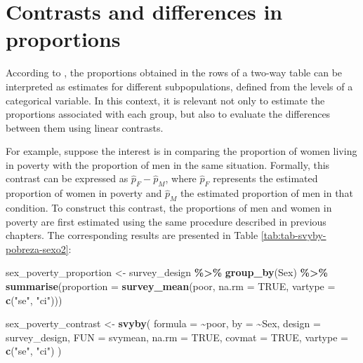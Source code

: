 \documentclass[
  english,
  12pt,
]{book}
\newenvironment{Shaded}{\begin{snugshade}}{\end{snugshade}}
\newcommand{\AttributeTok}[1]{\textcolor[rgb]{0.13,0.29,0.53}{#1}}
\newcommand{\ConstantTok}[1]{\textcolor[rgb]{0.56,0.35,0.01}{#1}}
\newcommand{\FunctionTok}[1]{\textcolor[rgb]{0.13,0.29,0.53}{\textbf{#1}}}
\newcommand{\NormalTok}[1]{#1}
\newcommand{\OtherTok}[1]{\textcolor[rgb]{0.56,0.35,0.01}{#1}}
\newcommand{\SpecialCharTok}[1]{\textcolor[rgb]{0.81,0.36,0.00}{\textbf{#1}}}
\newcommand{\StringTok}[1]{\textcolor[rgb]{0.31,0.60,0.02}{#1}}
\begin{document}
\section{Contrasts and differences in proportions}\label{contrastes-y-diferencias-de-proporciones}

According to \citet{heeringa2017applied}, the proportions obtained in the rows of a two-way table can be interpreted as estimates for different subpopulations, defined from the levels of a categorical variable. In this context, it is relevant not only to estimate the proportions associated with each group, but also to evaluate the differences between them using linear contrasts.

For example, suppose the interest is in comparing the proportion of women living in poverty with the proportion of men in the same situation. Formally, this contrast can be expressed as \(\hat{p}_F - \hat{p}_M\), where \(\hat{p}_F\) represents the estimated proportion of women in poverty and \(\hat{p}_M\) the estimated proportion of men in that condition. To construct this contrast, the proportions of men and women in poverty are first estimated using the same procedure described in previous chapters. The corresponding results are presented in Table \ref{tab:tab-svyby-pobreza-sexo2}:

\begin{Shaded}
\begin{Highlighting}[]
\NormalTok{sex\_poverty\_proportion }\OtherTok{\textless{}{-}}\NormalTok{ survey\_design }\SpecialCharTok{\%\textgreater{}\%}
  \FunctionTok{group\_by}\NormalTok{(Sex) }\SpecialCharTok{\%\textgreater{}\%}
  \FunctionTok{summarise}\NormalTok{(}\AttributeTok{proportion =} \FunctionTok{survey\_mean}\NormalTok{(poor,}
                                     \AttributeTok{na.rm =} \ConstantTok{TRUE}\NormalTok{,}
                                     \AttributeTok{vartype =} \FunctionTok{c}\NormalTok{(}\StringTok{"se"}\NormalTok{, }\StringTok{"ci"}\NormalTok{)))}

\NormalTok{sex\_poverty\_contrast }\OtherTok{\textless{}{-}} \FunctionTok{svyby}\NormalTok{(}
  \AttributeTok{formula =} \SpecialCharTok{\textasciitilde{}}\NormalTok{poor,}
  \AttributeTok{by =} \SpecialCharTok{\textasciitilde{}}\NormalTok{Sex,}
  \AttributeTok{design =}\NormalTok{ survey\_design,}
  \AttributeTok{FUN =}\NormalTok{ svymean,}
  \AttributeTok{na.rm =} \ConstantTok{TRUE}\NormalTok{,}
  \AttributeTok{covmat =} \ConstantTok{TRUE}\NormalTok{,}
  \AttributeTok{vartype =} \FunctionTok{c}\NormalTok{(}\StringTok{"se"}\NormalTok{, }\StringTok{"ci"}\NormalTok{)}
\NormalTok{)}
\end{Highlighting}
\end{Shaded}
\end{document}
